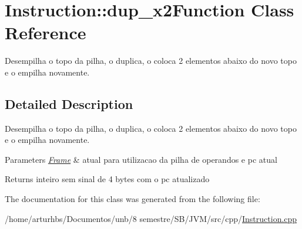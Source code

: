 \hypertarget{classInstruction_1_1dup__x2Function}{}\section{Instruction\+:\+:dup\+\_\+x2\+Function Class Reference}
\label{classInstruction_1_1dup__x2Function}


Desempilha o topo da pilha, o duplica, o coloca 2 elementos abaixo do novo topo e o empilha novamente.  




\subsection{Detailed Description}
Desempilha o topo da pilha, o duplica, o coloca 2 elementos abaixo do novo topo e o empilha novamente. 


\begin{DoxyParams}{Parameters}
{\em \hyperlink{classFrame}{Frame}} & atual para utilizacao da pilha de operandos e pc atual \\
\hline
\end{DoxyParams}
\begin{DoxyReturn}{Returns}
inteiro sem sinal de 4 bytes com o pc atualizado 
\end{DoxyReturn}


The documentation for this class was generated from the following file\+:\begin{DoxyCompactItemize}
\item 
/home/arturhbs/\+Documentos/unb/8 semestre/\+S\+B/\+J\+V\+M/src/cpp/\hyperlink{Instruction_8cpp}{Instruction.\+cpp}\end{DoxyCompactItemize}
